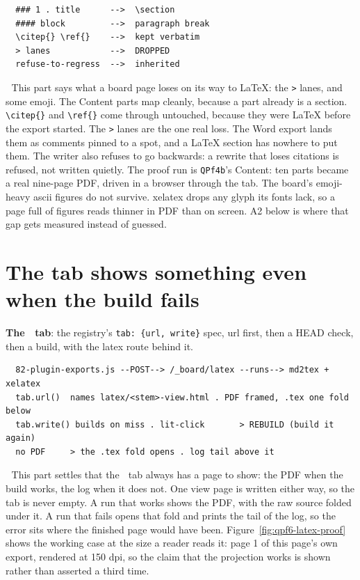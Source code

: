 \begin{verbatim}
  ### 1 . title      -->  \section
  #### block         -->  paragraph break
  \citep{} \ref{}    -->  kept verbatim
  > lanes            -->  DROPPED
  refuse-to-regress  -->  inherited
\end{verbatim}
📌 This part says what a board page loses on its way to LaTeX: the \texttt{>} lanes, and some emoji. The Content parts map cleanly, because a part already is a section. \texttt{\textbackslash{}citep\{\}} and \texttt{\textbackslash{}ref\{\}} come through untouched, because they were LaTeX before the export started. The \texttt{>} lanes are the one real loss. The Word export lands them as comments pinned to a spot, and a LaTeX section has nowhere to put them. The writer also refuses to go backwards: a rewrite that loses citations is refused, not written quietly. The proof run is \texttt{QPf4b}'s Content: ten parts became a real nine-page PDF, driven in a browser through the tab. The board's emoji-heavy ascii figures do not survive. xelatex drops any glyph its fonts lack, so a page full of figures reads thinner in PDF than on screen. A2 below is where that gap gets measured instead of guessed.


\section{The tab shows something even when the build fails}
\textbf{The 📜 tab}: the registry's \texttt{tab: \{url, write\}} spec, url first, then a HEAD check, then a build, with the latex route behind it.

\begin{verbatim}
  82-plugin-exports.js --POST--> /_board/latex --runs--> md2tex + xelatex
  tab.url()  names latex/<stem>-view.html . PDF framed, .tex one fold below
  tab.write() builds on miss . lit-click       > REBUILD (build it again)
  no PDF     > the .tex fold opens . log tail above it
\end{verbatim}
📌 This part settles that the 📜 tab always has a page to show: the PDF when the build works, the log when it does not. One view page is written either way, so the tab is never empty. A run that works shows the PDF, with the raw source folded under it. A run that fails opens that fold and prints the tail of the log, so the error sits where the finished page would have been. Figure~\ref{fig:qpf6-latex-proof} shows the working case at the size a reader reads it: page 1 of this page's own export, rendered at 150 dpi, so the claim that the projection works is shown rather than asserted a third time.

